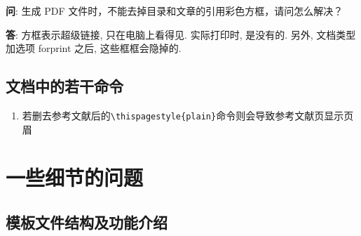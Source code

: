 \documentclass[class = professional, oneside]{gdufe_master_thesis}
\begin{document}
\textbf{问}: {\kaishu 生成 PDF 文件时，不能去掉目录和文章的引用彩色方框，请问怎么解决？}

\textbf{答}: {\kaishu 方框表示超级链接, 只在电脑上看得见. 实际打印时, 是没有的. 另外, 文档类型加选项 forprint 之后, 这些框框会隐掉的. }

\section{文档中的若干命令}
\begin{enumerate}
    \item 若删去参考文献后的\verb|\thispagestyle{plain}|命令则会导致参考文献页显示页眉
\end{enumerate}


\chapter{一些细节的问题}

\section{模板文件结构及功能介绍}
\end{document}
